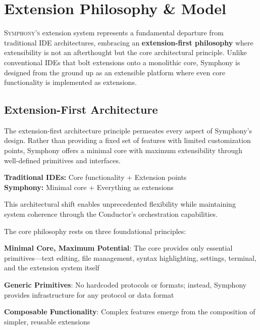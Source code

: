 
\section{Extension Philosophy \& Model}
\label{sec:extension-philosophy-model}

\lettrine{S}{ymphony's} extension system represents a fundamental departure from traditional IDE architectures, embracing an \textbf{extension-first philosophy} where extensibility is not an afterthought but the core architectural principle. Unlike conventional IDEs that bolt extensions onto a monolithic core, Symphony is designed from the ground up as an extensible platform where even core functionality is implemented as extensions.

\subsection{Extension-First Architecture}
\label{subsec:extension-first-architecture}

The extension-first architecture principle permeates every aspect of Symphony's design. Rather than providing a fixed set of features with limited customization points, Symphony offers a minimal core with maximum extensibility through well-defined primitives and interfaces.

\begin{infobox}[title=Extension-First vs Traditional Architecture]
\textbf{Traditional IDEs:} Core functionality + Extension points \\
\textbf{Symphony:} Minimal core + Everything as extensions

This architectural shift enables unprecedented flexibility while maintaining system coherence through the Conductor's orchestration capabilities.
\end{infobox}

The core philosophy rests on three foundational principles:

\begin{compactlist}
\item \textbf{Minimal Core, Maximum Potential}: The core provides only essential primitives—text editing, file management, syntax highlighting, settings, terminal, and the extension system itself
\item \textbf{Generic Primitives}: No hardcoded protocols or formats; instead, Symphony provides infrastructure for any protocol or data format
\item \textbf{Composable Functionality}: Complex features emerge from the composition of simpler, reusable extensions
\end{compactlist}

